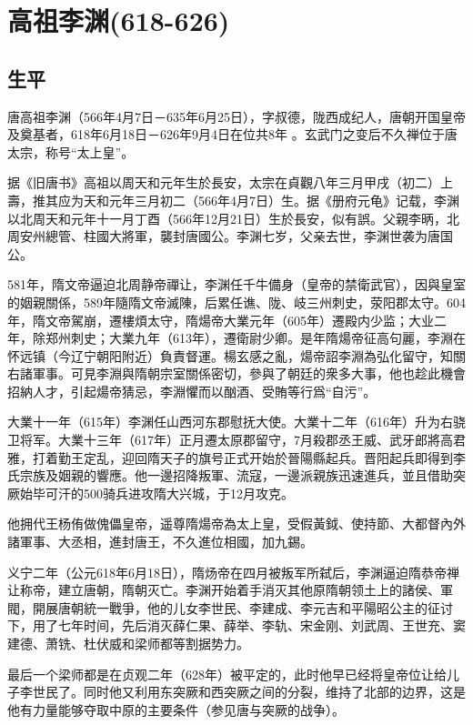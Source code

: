 
\section{高祖李渊\tiny(618-626)}

\subsection{生平}

唐高祖李渊（566年4月7日－635年6月25日），字叔德，陇西成纪人，唐朝开国皇帝及奠基者，618年6月18日－626年9月4日在位共8年 。玄武门之变后不久禅位于唐太宗，称号“太上皇”。

据《旧唐书》高祖以周天和元年生於長安，太宗在貞觀八年三月甲戌（初二）上壽，推其应为天和元年三月初二（566年4月7日）生。据《册府元龟》记载，李渊以北周天和元年十一月丁酉（566年12月21日）生於長安，似有誤。父親李昞，北周安州總管、柱國大將軍，襲封唐國公。李渊七岁，父亲去世，李渊世袭为唐国公。

581年，隋文帝逼迫北周静帝禪让，李渊任千牛備身（皇帝的禁衛武官），因與皇室的姻親關係，589年隨隋文帝滅陳，后累任谯、陇、岐三州刺史，荥阳郡太守。604年，隋文帝駕崩，遷樓煩太守，隋煬帝大業元年（605年）遷殿内少监；大业二年，除郑州刺史；大業九年（613年），遷衛尉少卿。是年隋煬帝征高句麗，李淵在怀远镇（今辽宁朝阳附近）負責督運。楊玄感之亂，煬帝詔李淵為弘化留守，知關右諸軍事。可見李淵與隋朝宗室關係密切，參與了朝廷的衆多大事，他也趁此機會招納人才，引起煬帝猜忌，李淵懼而以酗酒、受賄等行爲“自污”。

大業十一年（615年）李渊任山西河东郡慰抚大使。大業十二年（616年）升为右骁卫将军。大業十三年（617年）正月遷太原郡留守，7月殺郡丞王威、武牙郎將高君雅，打着勤王定乱，迎回隋天子的旗号正式开始於晉陽縣起兵。晋阳起兵即得到李氏宗族及姻親的響應。他一邊招降叛軍、流寇，一邊派親族迅速進兵，並且借助突厥始毕可汗的500骑兵进攻隋大兴城，于12月攻克。

他拥代王杨侑做傀儡皇帝，遥尊隋煬帝為太上皇，受假黃鉞、使持節、大都督內外諸軍事、大丞相，進封唐王，不久進位相國，加九錫。

义宁二年（公元618年6月18日），隋炀帝在四月被叛军所弑后，李渊逼迫隋恭帝禅让称帝，建立唐朝，隋朝灭亡。李渊开始着手消灭其他原隋朝领土上的諸侯、軍閥，開展唐朝統一戰爭，他的儿女李世民、李建成、李元吉和平陽昭公主的征讨下，用了七年时间，先后消灭薛仁果、薛举、李轨、宋金刚、刘武周、王世充、窦建德、萧铣、杜伏威和梁师都等割据势力。

最后一个梁师都是在贞观二年（628年）被平定的，此时他早已经将皇帝位让给儿子李世民了。同时他又利用东突厥和西突厥之间的分裂，维持了北部的边界，这是他有力量能够夺取中原的主要条件（参见唐与突厥的战争）。

